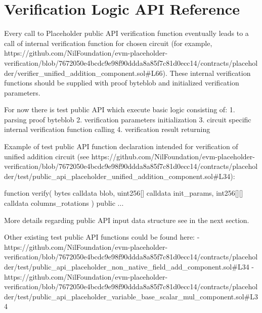 \section{Verification Logic API Reference}

Every call to Placeholder public API verification function eventually leads to a call of internal verification function for chosen circuit (for example, https://github.com/NilFoundation/evm-placeholder-verification/blob/7672050e4bcdc9e98f90ddda8a85f7c81d0ecc14/contracts/placeholder/verifier_unified_addition_component.sol#L66). 
These internal verification functions should be supplied with proof byteblob and initialized verification parameters.

For now there is test public API which execute basic logic consisting of:
1. parsing proof byteblob
2. verification parameters initialization
3. circuit specific internal verification function calling
4. verification result returning

Example of test public API function declaration intended for verification of unified addition circuit (see https://github.com/NilFoundation/evm-placeholder-verification/blob/7672050e4bcdc9e98f90ddda8a85f7c81d0ecc14/contracts/placeholder/test/public_api_placeholder_unified_addition_component.sol#L34):

function verify(
    bytes calldata blob,
    uint256[] calldata init_params,
    int256[][] calldata columns_rotations
) public {...}

More details regarding public API input data structure see in the next section.

Other existing test public API functions could be found here:
- https://github.com/NilFoundation/evm-placeholder-verification/blob/7672050e4bcdc9e98f90ddda8a85f7c81d0ecc14/contracts/placeholder/test/public_api_placeholder_non_native_field_add_component.sol#L34
- https://github.com/NilFoundation/evm-placeholder-verification/blob/7672050e4bcdc9e98f90ddda8a85f7c81d0ecc14/contracts/placeholder/test/public_api_placeholder_variable_base_scalar_mul_component.sol#L34
